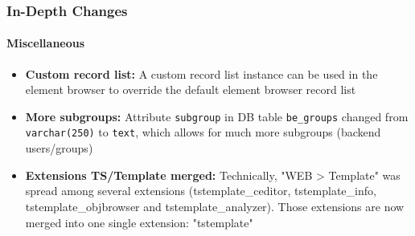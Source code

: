 \begin{frame}[fragile]
	\frametitle{In-Depth Changes}
	\framesubtitle{Miscellaneous}

	\begin{itemize}

		\item \textbf{Custom record list:}\newline
			\small
				A custom record list instance can be used in the element browser to override the default element browser record list
			\normalsize

		\item \textbf{More subgroups:}\newline
			\small
				Attribute \texttt{subgroup} in DB table \texttt{be\_groups} changed from \texttt{varchar(250)} to \texttt{text}, which allows for much more subgroups (backend users/groups)
			\normalsize

		\item \textbf{Extensions TS/Template merged:}\newline
			\small
				Technically, "WEB > Template" was spread among several extensions (tstemplate\_ceditor, tstemplate\_info, tstemplate\_objbrowser and tstemplate\_analyzer). Those extensions are now merged into one single extension: "tstemplate"
			\normalsize

	\end{itemize}
	
\end{frame}


